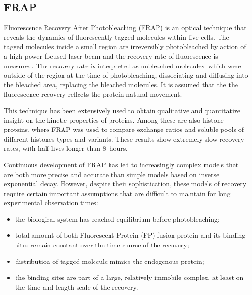   \subsection{FRAP}

    Fluorescence Recovery After Photobleaching (FRAP) is an optical technique
    that reveals the dynamics of fluorescently tagged molecules within live cells.
    The tagged molecules inside a small region are irreversibly photobleached by
    action of a high-power focused laser beam and the recovery rate of fluorescence
    is measured. The recovery rate is interpreted as unbleached molecules,
    which were outside of the region at the time of photobleaching, dissociating and
    diffusing into the bleached area, replacing the bleached molecules. It is assumed that the
    the fluorescence recovery reflects the protein natural movement.

    This technique has been extensively used to obtain qualitative and quantitative
    insight on the kinetic properties of proteins. Among these are also
    histone proteins, where FRAP was used to compare exchange ratios and
    soluble pools of different histones types and variants. These results
    show extremely slow recovery rates, with half-lives longer than 8~hours.


    Continuous development of FRAP has
    led to increasingly complex models that are both more precise and accurate than simple models
    based on inverse exponential decay.
    However, despite their sophistication, these models of recovery require certain important
    assumptions that are difficult to maintain for long experimental observation times:

    \begin{itemize}
      \item the biological system has reached equilibrium before photobleaching;
      \item total amount of both Fluorescent Protein (FP) fusion protein and its
            binding sites remain constant over the time course of the recovery;
      \item distribution of tagged molecule mimics the endogenous protein;
      \item the binding sites are part of a large, relatively immobile complex, at
            least on the time and length scale of the recovery.
    \end{itemize}

